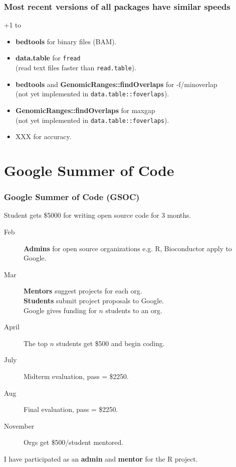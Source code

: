 \documentclass{beamer}
\begin{document}
\begin{frame}
  \frametitle{Most recent versions of all packages have similar
    speeds}
  +1 to
  \begin{itemize}
  \item \textbf{bedtools} for binary files (BAM).
  \item \textbf{data.table} for \texttt{fread}\\
    (read text files faster than \texttt{read.table}).
  \item \textbf{bedtools} and \textbf{GenomicRanges::findOverlaps} 
    for -f/minoverlap\\
    (not yet implemented in \texttt{data.table::foverlaps}).
  \item \textbf{GenomicRanges::findOverlaps} for maxgap \\
    (not yet implemented in \texttt{data.table::foverlaps}).
  \item XXX for accuracy.
  \end{itemize}

\end{frame}

\section{Google Summer of Code}

\begin{frame}
  \frametitle{Google Summer of Code (GSOC)}
Student gets \$5000 for writing open source code for
    3 months.
    \begin{description}
    \item[Feb] \textbf{Admins} for open source organizations
      e.g. R, Bioconductor apply to Google.
    \item[Mar] \textbf{Mentors} suggest projects for each org.\\
      \textbf{Students} submit project proposals to Google.\\
      Google gives funding for $n$ students to an org.
    \item[April] The top $n$ students get \$500 and begin coding.
    \item[July] Midterm evaluation, pass = \$2250.
    \item[Aug] Final evaluation, pass = \$2250.
    \item[November] Orgs get \$500/student mentored.
    \end{description}

  I have participated as an \textbf{admin} and \textbf{mentor} for the
  R project.
\end{frame}
\end{document}
